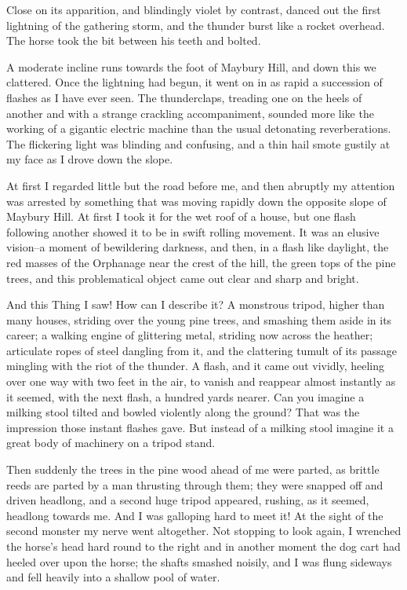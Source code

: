 Close on its apparition, and blindingly violet by contrast, danced
out the first lightning of the gathering storm, and the thunder
burst like a rocket overhead. The horse took the bit between his
teeth and bolted.

A moderate incline runs towards the foot of Maybury Hill, and down
this we clattered. Once the lightning had begun, it went on in as
rapid a succession of flashes as I have ever seen. The
thunderclaps, treading one on the heels of another and with a
strange crackling accompaniment, sounded more like the working of a
gigantic electric machine than the usual detonating reverberations.
The flickering light was blinding and confusing, and a thin hail
smote gustily at my face as I drove down the slope.

At first I regarded little but the road before me, and then
abruptly my attention was arrested by something that was moving
rapidly down the opposite slope of Maybury Hill. At first I took it
for the wet roof of a house, but one flash following another showed
it to be in swift rolling movement. It was an elusive vision--a
moment of bewildering darkness, and then, in a flash like daylight,
the red masses of the Orphanage near the crest of the hill, the
green tops of the pine trees, and this problematical object came
out clear and sharp and bright.

And this Thing I saw! How can I describe it? A monstrous tripod,
higher than many houses, striding over the young pine trees, and
smashing them aside in its career; a walking engine of glittering
metal, striding now across the heather; articulate ropes of steel
dangling from it, and the clattering tumult of its passage mingling
with the riot of the thunder. A flash, and it came out vividly,
heeling over one way with two feet in the air, to vanish and
reappear almost instantly as it seemed, with the next flash, a
hundred yards nearer. Can you imagine a milking stool tilted and
bowled violently along the ground? That was the impression those
instant flashes gave. But instead of a milking stool imagine it a
great body of machinery on a tripod stand.

Then suddenly the trees in the pine wood ahead of me were parted,
as brittle reeds are parted by a man thrusting through them; they
were snapped off and driven headlong, and a second huge tripod
appeared, rushing, as it seemed, headlong towards me. And I was
galloping hard to meet it! At the sight of the second monster my
nerve went altogether. Not stopping to look again, I wrenched the
horse's head hard round to the right and in another moment the dog
cart had heeled over upon the horse; the shafts smashed noisily,
and I was flung sideways and fell heavily into a shallow pool of
water.


